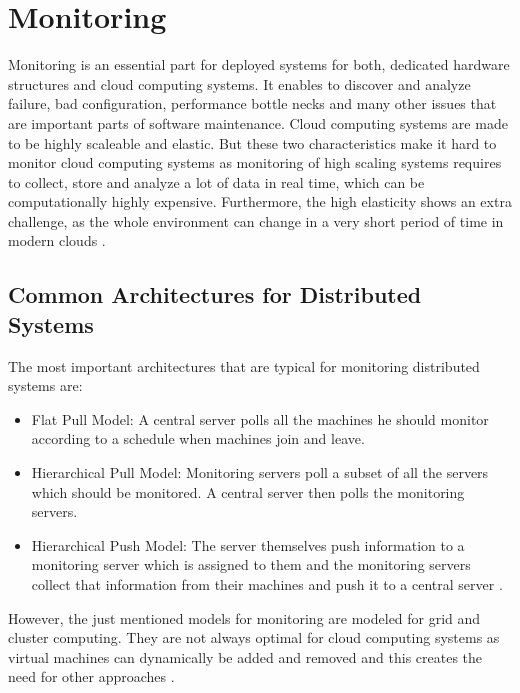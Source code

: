 \section{Monitoring}
Monitoring is an essential part for deployed systems for both,  dedicated hardware structures and cloud computing systems. It enables to discover and analyze failure, bad configuration, performance bottle necks and many other issues that are important parts of software maintenance. Cloud computing systems are made to be highly scaleable and elastic. But these two characteristics make it hard to monitor cloud computing systems as monitoring of high scaling systems requires to collect, store and analyze a lot of data in real time, which can be computationally highly expensive. Furthermore, the high elasticity shows an extra challenge, as the whole environment can change in a very short period of time in modern clouds \cite{Ward_2014}.

\subsection{Common Architectures for Distributed Systems}
\label{sec:common_arc_ds}
The most important architectures that are typical for monitoring distributed systems are:

\begin{itemize}
	\item Flat Pull Model: A central server polls all the machines he should monitor according to a schedule when machines join and leave.
	\item Hierarchical Pull Model: Monitoring servers poll a subset of all the servers which should be monitored. A central server then polls the monitoring servers.
	\item Hierarchical Push Model: The server themselves push information to a monitoring server which is assigned to them and the monitoring servers collect that information from their machines and push it to a central server \cite{Ward_2014}.
\end{itemize}

However, the just mentioned models for monitoring are modeled for grid and cluster computing. They are not always optimal for cloud computing systems as virtual machines can dynamically be added and removed and this creates the need for other approaches \cite{Ward_2014, He_2010}. 

